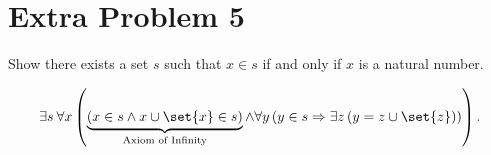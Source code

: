\documentclass[10pt]{mypackage}
\begin{document}
\section{Extra Problem 5}%
\begin{problem}
  Show there exists a set $s$ such that $x\in s$ if and only if $x$ is a natural number.
\end{problem}
\begin{solution}
  \begin{align*}
    \exists s \: \forall x \left(\underbrace{\left(x\in s \wedge x\cup \set{x}\in s\right)}_{\text{Axiom of Infinity}}\wedge \forall y\left(y\in s \Rightarrow \exists z\left(y = z \cup \set{z}\right)\right)\right).
  \end{align*}
\end{solution}
\end{document}
